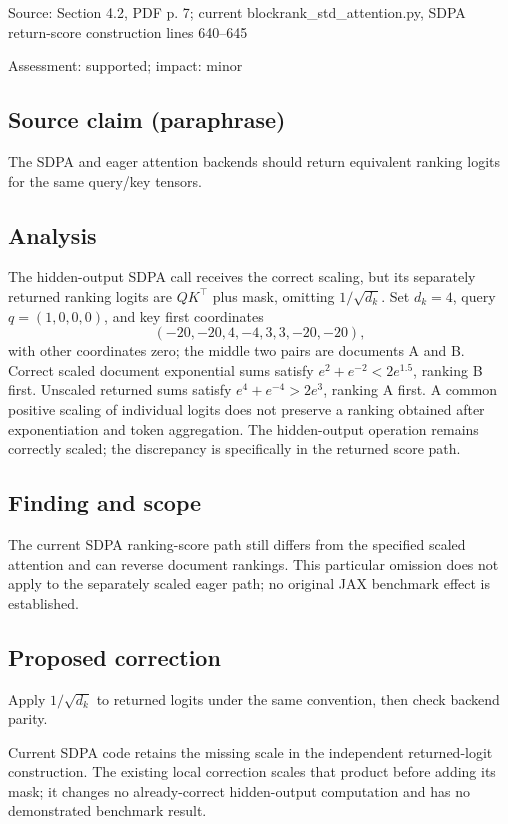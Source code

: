 \documentclass[11pt]{article}
\begin{document}
Source: Section 4.2, PDF p. 7; current blockrank\_std\_attention.py, SDPA return-score construction lines 640–645

Assessment: supported; impact: minor

\subsection*{Source claim (paraphrase)}

The SDPA and eager attention backends should return equivalent ranking logits for the same query/key tensors.

\subsection*{Analysis}

The hidden-output SDPA call receives the correct scaling, but its separately returned ranking logits are \(QK^\top\) plus mask, omitting \(1/\sqrt{d_k}\). Set \(d_k=4\), query \(q=(1,0,0,0)\), and key first coordinates \[(-20,-20,4,-4,3,3,-20,-20),\] with other coordinates zero; the middle two pairs are documents A and B. Correct scaled document exponential sums satisfy \(e^2+e^{-2}<2e^{1.5}\), ranking B first. Unscaled returned sums satisfy \(e^4+e^{-4}>2e^3\), ranking A first. A common positive scaling of individual logits does not preserve a ranking obtained after exponentiation and token aggregation. The hidden-output operation remains correctly scaled; the discrepancy is specifically in the returned score path.

\subsection*{Finding and scope}

The current SDPA ranking-score path still differs from the specified scaled attention and can reverse document rankings. This particular omission does not apply to the separately scaled eager path; no original JAX benchmark effect is established.

\subsection*{Proposed correction}

Apply \(1/\sqrt{d_k}\) to returned logits under the same convention, then check backend parity.

Current SDPA code retains the missing scale in the independent returned-logit construction. The existing local correction scales that product before adding its mask; it changes no already-correct hidden-output computation and has no demonstrated benchmark result.
\end{document}
